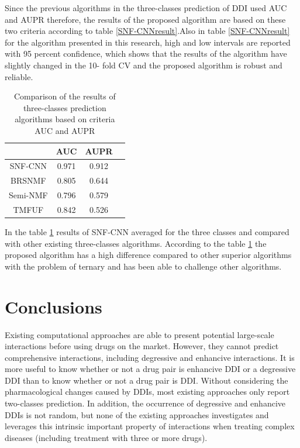 \documentclass{bmcart}
\begin{document}
Since the previous algorithms in the three-classes prediction of DDI used AUC and AUPR therefore, the results of the proposed algorithm are based on these two criteria according to table
\ref{SNF-CNNresult}.Also in table
\ref{SNF-CNNresult}
for the algorithm presented in this research, high and low intervals are reported with 95 percent confidence, which shows that the results of the algorithm have slightly changed in the 10- fold CV and the proposed algorithm is robust and reliable.

\begin{table}[h!]
\centering 
\begin{tabular}{|c|c|c|c|}
\hline
& AUC	& AUPR \\
\hline
SNF-CNN	& 0.971 & 0.912\\
\hline
BRSNMF\cite{shi2019detecting}  & 0.805 & 0.644\\
\hline
Semi-NMF \cite{yu2018predicting} & 0.796 & 0.579\\
\hline
TMFUF\cite{shi2018tmfuf}   & 0.842  & 0.526\\
\hline
\end{tabular}
\newline 
	\caption{Comparison of the results of three-classes prediction algorithms based on criteria AUC and AUPR}
	\label{AUCAUPR}
\end{table}

In the table
\ref{AUCAUPR}
results of SNF-CNN averaged for the three classes and compared with other existing three-classes algorithms. According to the table
\ref{AUCAUPR} the proposed algorithm has a high difference compared to other superior algorithms with the problem of ternary and has been able to challenge other algorithms.


\section*{Conclusions}
Existing computational approaches are able to present potential large-scale interactions before using drugs on the market. However, they cannot predict comprehensive interactions, including degressive and enhancive interactions. It is more useful to know whether or not a drug pair is enhancive DDI or a degressive DDI  than to know whether or not a drug pair is DDI. Without considering the pharmacological changes caused by DDIs, most existing approaches only report two-classes prediction.  In addition, the occurrence of degressive and enhancive DDIs is not random, but none of the existing approaches investigates and leverages this intrinsic important property of interactions when treating complex diseases (including treatment with three or more drugs).
\end{document}

